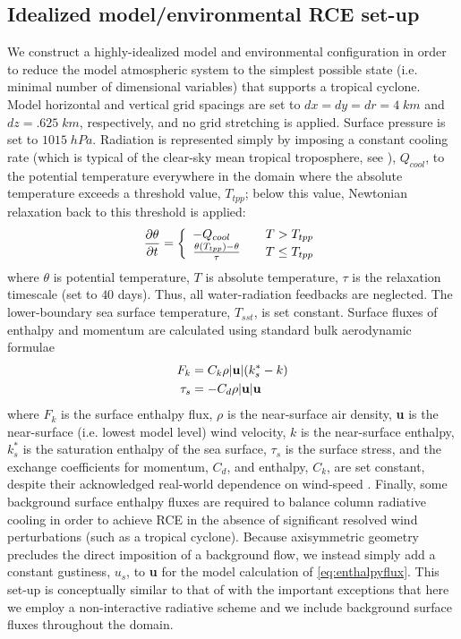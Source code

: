 \documentclass[12pt]{article}
\begin{document}
\subsection{Idealized model/environmental RCE set-up}
We construct a highly-idealized model and environmental configuration in order to reduce the model atmospheric system to the simplest possible state (i.e. minimal number of dimensional variables) that supports a tropical cyclone. Model horizontal and vertical grid spacings are set to $dx = dy = dr = 4 \; km$ and $dz = .625 \; km$, respectively, and no grid stretching is applied. Surface pressure is set to $1015 \; hPa$. Radiation is represented simply by imposing a constant cooling rate (which is typical of the clear-sky mean tropical troposphere, see \cite{Hartmann_Holton_Fu_2001}), $Q_{cool}$, to the potential temperature everywhere in the domain where the absolute temperature exceeds a threshold value, $T_{tpp}$; below this value, Newtonian relaxation back to this threshold is applied:
\begin{equation}
\label{eq:radscheme}
\frac{\partial \theta}{\partial t} = \left\{ 
\begin{array}{l l}
  - Q_{cool} & \quad \mbox{$T > T_{tpp}$}\\
  \frac{\theta(T_{tpp})-\theta}{\tau} & \quad \mbox{$T \le T_{tpp}$}\\
  \end{array} \right.
\end{equation}
where $\theta$ is potential temperature, $T$ is absolute temperature, $\tau$ is the relaxation timescale (set to $40$ days). Thus, all water-radiation feedbacks are neglected. The lower-boundary sea surface temperature, $T_{sst}$, is set constant. Surface fluxes of enthalpy and momentum are calculated using standard bulk aerodynamic formulae
\begin{align}
	\label{eq:enthalpyflux}
	F_k &= C_k \rho |{\bf u}|(k^*_s-k) \\
	\label{eq:sfcstress}
	\tau_s &= -C_d \rho |{\bf u}|{\bf u}
\end{align}
where $F_k$ is the surface enthalpy flux, $\rho$ is the near-surface air density, {\bf u} is the near-surface (i.e. lowest model level) wind velocity, $k$ is the near-surface enthalpy, $k^*_s$ is the saturation enthalpy of the sea surface, $\tau_s$ is the surface stress, and the exchange coefficients for momentum, $C_d$, and enthalpy, $C_k$, are set constant, despite their acknowledged real-world dependence on wind-speed \citep{Powell_Vickery_Reinhold_2003}. Finally, some background surface enthalpy fluxes are required to balance column radiative cooling in order to achieve RCE in the absence of significant resolved wind perturbations (such as a tropical cyclone). Because axisymmetric geometry precludes the direct imposition of a background flow, we instead simply add a constant gustiness, $u_s$, to {\bf u} for the model calculation of \eqref{eq:enthalpyflux}. This set-up is conceptually similar to that of \cite{Hakim_2011} with the important exceptions that here we employ a non-interactive radiative scheme and we include background surface fluxes throughout the domain.
\end{document}
